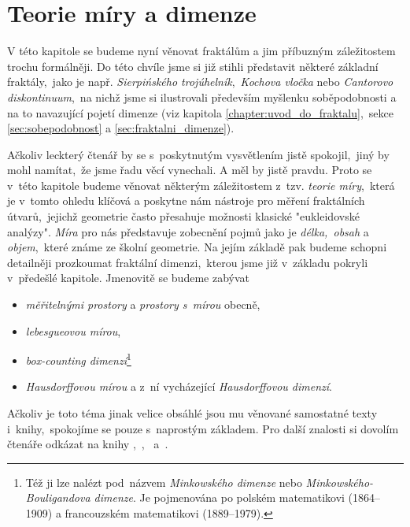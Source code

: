 \chapter{Teorie míry a dimenze}\label{chapter:teorie-miry-a-dimenze}

V této kapitole se budeme nyní věnovat fraktálům a jim příbuzným záležitostem trochu formálněji. Do této chvíle jsme si již stihli představit některé základní fraktály,~jako je např. \emph{Sierpińského trojúhelník},~\emph{Kochova vločka} nebo \emph{Cantorovo diskontinuum},~na nichž jsme si ilustrovali především myšlenku soběpodobnosti a na to navazující pojetí dimenze (viz kapitola \ref{chapter:uvod_do_fraktalu},~sekce \ref{sec:sobepodobnost} a \ref{sec:fraktalni_dimenze}).

Ačkoliv leckterý čtenář by se s~poskytnutým vysvětlením jistě spokojil,~jiný by mohl namítat,~že jsme řadu věcí vynechali. A měl by jistě pravdu. Proto se v~této kapitole budeme věnovat některým záležitostem z~tzv. \emph{teorie míry},~která je v~tomto ohledu klíčová a poskytne nám nástroje pro měření fraktálních útvarů,~jejichž geometrie často přesahuje možnosti klasické "eukleidovské analýzy". \emph{Míra} pro nás představuje zobecnění pojmů jako je \emph{délka,~obsah} a \emph{objem},~které známe ze školní geometrie. Na jejím základě pak budeme schopni detailněji prozkoumat fraktální dimenzi,~kterou jsme již v~základu pokryli v~předešlé kapitole. Jmenovitě se budeme zabývat
\begin{itemize}
    \item \emph{měřitelnými prostory} a \emph{prostory s~mírou} obecně,
    \item \emph{lebesgueovou mírou},
    \item \emph{box-counting dimenzí}\footnote{Též ji lze nalézt pod~názvem \emph{Minkowského dimenze} nebo \emph{Minkowského-Bouligandova dimenze}. Je pojmenována po polském matematikovi  (1864--1909) a francouzském matematikovi  (1889--1979).}
    \item \emph{Hausdorffovou mírou} a z~ní vycházející \emph{Hausdorffovou dimenzí}.
\end{itemize}

Ačkoliv je toto téma jinak velice obsáhlé jsou mu věnované samostatné texty i~knihy,~spokojíme se pouze s~naprostým základem. Pro další znalosti si dovolím čtenáře odkázat na knihy \cite{Falconer2014},~\cite{Lukes2013},~\cite{NetukaIntegral2016} a~\cite{Edgar2008}.

